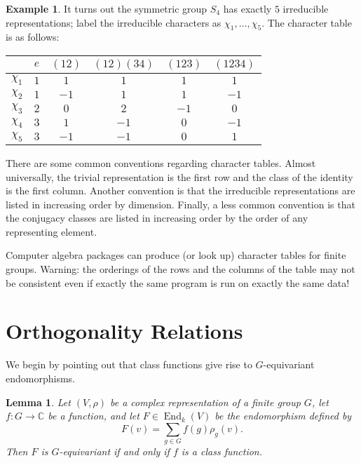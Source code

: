 \documentclass[12pt]{article}
\theoremstyle{plain}
\newtheorem{lemma}[theorem]{Lemma}
\theoremstyle{definition}
\newtheorem{example}[theorem]{Example}
\theoremstyle{remark}
\numberwithin{equation}{section}
\begin{document}
\begin{example}
It turns out the symmetric group $S_4$ has exactly $5$ irreducible
representations; label the irreducible characters
as $\chi_1, \ldots, \chi_5$.
The character table is as follows:
\begin{center}
\begin{tabular}{|c|c|c|c|c|c|}
\hline 
 & $e $ & $(12)$ & $(12)(34)$ & $(123)$ & $(1234)$\\
\hline 
\hline 
$\chi_1$ & $1$ & $1$ & $1$ & $1$ & $1$\\
\hline 
$\chi_2$ & $1$ & $-1$ & $1$ & $1$ & $-1$\\
\hline 
$\chi_3$ & $2$ & $0$ & $2$ & $-1$ & $0$\\
\hline 
$\chi_4$ & $3$ & $1$ & $-1$ & $0$ & $-1$\\
\hline 
$\chi_5$ & $3$ & $-1$ & $-1$ & $0$ & $1$\\
\hline 
\end{tabular}
\end{center}
\end{example}

There are some common conventions regarding character tables.
Almost universally,
the trivial representation is the first row and the class of the
identity is the first column.
Another convention is that the irreducible representations are listed in
increasing order by dimension.
Finally, a less common convention is that the conjugacy classes are listed in
increasing order by the order of any representing element.

Computer algebra packages can produce (or look up) character tables
for finite groups.  Warning: the orderings of the rows and the columns of the
table may not be consistent even if exactly the same program is run on
exactly the same data!

\section{Orthogonality Relations}

We begin by pointing out that class functions give rise to
$G$-equivariant endomorphisms.

\begin{lemma} \label{lem:class_function_endo}
Let $(V,\rho)$ be a complex representation of a finite group $G$,
let $f : G \to \mathbb{C}$ be a function, and let $F \in
\operatorname{End}_k(V)$ be the endomorphism defined by
\[
F(v) = \sum_{g \in G} f(g)\rho_g(v) .
\]
Then $F$ is $G$-equivariant if and only if $f$ is a class function.
\end{lemma}
\end{document}
